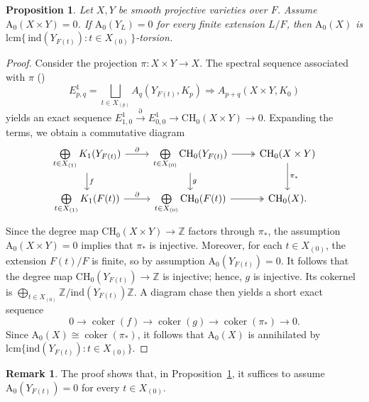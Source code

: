 \documentclass[10pt]{amsart}
\theoremstyle{plain}
\newtheorem{proposition}[thm]{Proposition}
\theoremstyle{definition}
\newtheorem{remark}[thm]{Remark}
\newcommand{\Z}{{\mathbb Z}}
\begin{document}
\begin{proposition}\label{better torsion bounds}
Let \(X,Y\) be smooth projective varieties over \(F\). Assume \(\mathrm{A_0}(X \times Y) = 0\). If \(\mathrm{A_0}(Y_L)=0\) for every finite extension \(L/F\), then \(\mathrm{A_0}(X)\) is 
\(\mathrm{lcm}\{\,\mathrm{ind}(Y_{F(t)}) : t \in X_{(0)}\,\}\)-torsion.
\end{proposition}
\begin{proof}
Consider the projection \(\pi: X \times Y \to X\). The spectral sequence associated with \(\pi\) (\cite[Section 8]{Rost}) \[
E^1_{p,q}= \bigsqcup\limits_{t \in X_{(p)}}A_q(Y_{F(t)},K_p) \Rightarrow A_{p+q}(X \times Y, K_0)\]
yields an exact sequence \({E^{1}_{1,0}} \xrightarrow{\partial} {E^{1}_{0,0}} \rightarrow  \mathrm{CH_0}(X \times Y) \rightarrow 0\). Expanding the terms, we obtain a commutative diagram
\[
\begin{tikzcd}
\bigoplus\limits_{t \in X_{(1)}} K_1(Y_{F(t)}) 
\arrow[d, "f"] 
\arrow[r, "\partial"] 
& \bigoplus\limits_{t \in X_{(0)}} \mathrm{CH_0}(Y_{F(t)}) 
\arrow[d, "g"]   
\arrow[r, two heads] 
& \mathrm{CH_0}(X \times Y)
\arrow[d, "\pi_{*}"] \\
\bigoplus\limits_{t \in X_{(1)}} K_1(F(t))              
\arrow[r, "\partial"] 
& \bigoplus\limits_{t \in X_{(0)}} \mathrm{CH_0}(F(t))                                   
\arrow[r, two heads] 
& \mathrm{CH_0}(X).          
\end{tikzcd}
\]
Since the degree map \(\mathrm{CH_0}(X \times Y) \to \mathbb{Z}\) factors through \(\pi_*\), the assumption \(\mathrm{A_0}(X \times Y)=0\) implies that \(\pi_*\) is injective. Moreover, for each \(t \in X_{(0)}\), the extension \(F(t)/F\) is finite, so by assumption \(\mathrm{A_0}(Y_{F(t)})=0\). It follows that the degree map \(\mathrm{CH_0}(Y_{F(t)}) \to \mathbb{Z}\) is injective; hence, \(g\) is injective. Its cokernel is \(\bigoplus_{t \in X_{(0)}} \Z/\mathrm{ind}(Y_{F(t)})\Z\).
A diagram chase then yields a short exact sequence
\[
0 \longrightarrow \operatorname{coker}(f) \longrightarrow \operatorname{coker}(g) \longrightarrow \operatorname{coker}(\pi_*) \longrightarrow 0.
\]
Since \(\mathrm{A_0}(X) \cong \operatorname{coker}(\pi_*)\), it follows that \(\mathrm{A_0}(X)\) is annihilated by 
\(\mathrm{lcm}\{\mathrm{ind}(Y_{F(t)}) : t \in X_{(0)}\}\).
\end{proof}
\begin{remark}
The proof shows that, in Proposition~\ref{better torsion bounds}, it suffices to assume \(\mathrm{A_0}(Y_{F(t)})=0\) for every \(t \in X_{(0)}\).
\end{remark}
\end{document}
